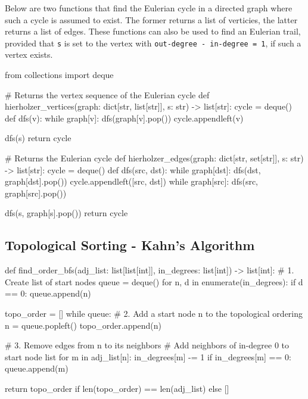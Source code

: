 \documentclass[12pt, titlepage]{article}
\begin{document}
Below are two functions that find the Eulerian cycle in a directed graph where such a cycle is assumed to exist. The former returns a list of verticies, the latter returns a list of edges. These functions can also be used to find an Eulerian trail, provided that \texttt{s} is set to the vertex with \texttt{out-degree - in-degree = 1}, if such a vertex exists. \medskip

\begin{python}
from collections import deque

# Returns the vertex sequence of the Eulerian cycle
def hierholzer_vertices(graph: dict[str, list[str]], s: str) -> list[str]:
    cycle = deque()
    def dfs(v):
        while graph[v]:
            dfs(graph[v].pop())
        cycle.appendleft(v)

    dfs(s)
    return cycle


# Returns the Eulerian cycle
def hierholzer_edges(graph: dict[str, set[str]], s: str) -> list[str]:
    cycle = deque()
    def dfs(src, dst):
        while graph[dst]:
            dfs(dst, graph[dst].pop())
        cycle.appendleft([src, dst])
        while graph[src]:
            dfs(src, graph[src].pop())

    dfs(s, graph[s].pop())
    return cycle
\end{python}

\subsection{Topological Sorting - Kahn's Algorithm}
\begin{python}
def find_order_bfs(adj_list: list[list[int]],
                   in_degrees: list[int]) -> list[int]:
    # 1. Create list of start nodes
    queue = deque()
    for n, d in enumerate(in_degrees):
        if d == 0:
            queue.append(n)

    topo_order = []
    while queue:
        # 2. Add a start node n to the topological ordering
        n = queue.popleft()
        topo_order.append(n)

        # 3. Remove edges from n to its neighbors
        #    Add neighbors of in-degree 0 to start node list
        for m in adj_list[n]:
            in_degrees[m] -= 1
            if in_degrees[m] == 0:
                queue.append(m)

    return topo_order if len(topo_order) == len(adj_list) else []
\end{python}
\end{document}
